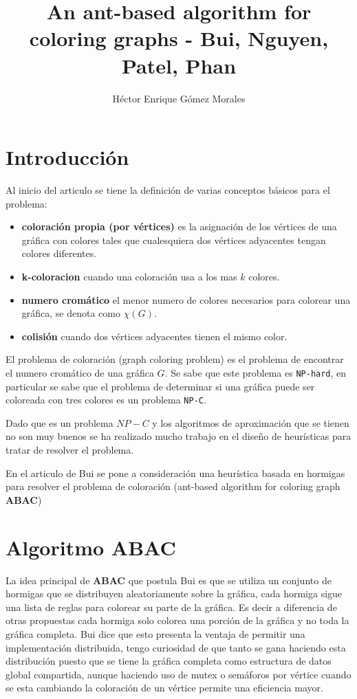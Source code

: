 \documentclass{article}
\author{Héctor Enrique Gómez Morales}
\title{An ant-based algorithm for coloring graphs - Bui, Nguyen, Patel, Phan}
\begin{document}
\maketitle
\section{Introducción}
Al inicio del articulo se tiene la definición de varias conceptos básicos para el problema:

\begin{itemize}
  \item \textbf{coloración propia (por vértices)} es la asignación de los vértices de una gráfica con colores tales que cualesquiera dos vértices adyacentes tengan colores diferentes.
  \item \textbf{k-coloracion} cuando una coloración usa a los mas $k$ colores.
  \item \textbf{numero cromático} el menor numero de colores necesarios para colorear una gráfica, se denota como $\chi(G)$.
  \item \textbf{colisión} cuando dos vértices adyacentes tienen el mismo color.
\end{itemize}

El problema de coloración (graph coloring problem) es el problema de encontrar el numero cromático de una gráfica $G$. Se sabe que este problema es \texttt{NP-hard}, en particular se sabe que el problema de determinar si una gráfica puede ser coloreada con tres colores es un problema \texttt{NP-C}.

Dado que es un problema $NP-C$ y los algoritmos de aproximación que se tienen no son muy buenos se ha realizado mucho trabajo en el diseño de heurísticas para tratar de resolver el problema.

En el articulo de Bui se pone a consideración una heurística basada en hormigas para resolver el problema de coloración (ant-based algorithm for coloring graph \textbf{ABAC})

\section{Algoritmo ABAC}
La idea principal de \textbf{ABAC} que postula Bui es que se utiliza un conjunto de hormigas que se distribuyen aleatoriamente sobre la gráfica, cada hormiga sigue una lista de reglas para colorear su parte de la gráfica. Es decir a diferencia de otras propuestas cada hormiga solo colorea una porción de la gráfica y no toda la gráfica completa. Bui dice que esto presenta la ventaja de permitir una implementación distribuida, tengo curiosidad de que tanto se gana haciendo esta distribución puesto que se tiene la gráfica completa como estructura de datos global compartida, aunque haciendo uso de mutex o semáforos por vértice cuando se esta cambiando la coloración de un vértice permite una eficiencia mayor.
\end{document}
